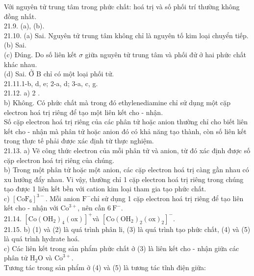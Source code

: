 \documentclass[10pt]{article}
\begin{document}
Với nguyên tử trung tâm trong phức chất: hoá trị và số phối trí thường không đồng nhất.\\
21.9. (a), (b).\\
21.10. (a) Sai. Nguyên tử trung tâm không chỉ là nguyên tố kim loại chuyển tiếp.\\
(b) Sai.\\
(c) Đúng. Do số liên kết $\sigma$ giữa nguyên tử trung tâm và phối đử ở hai phức chất khác nhau.\\
(d) Sai. Ở B chỉ có một loại phối tử.\\
21.11.1-b, d, e; 2-a, d; 3-a, c, g.\\
21.12. a) 2 .\\
b) Không. Có phức chất mà trong đó ethylenediamine chỉ sử dụng một cặp electron hoá trị riêng để tạo một liên kết cho - nhận.\\
Số cặp electron hoá trị riêng của các phân tử hoặc anion thường chỉ cho biết liên kết cho - nhận mà phân tử hoặc anion đó có khả năng tạo thành, còn số liên kết trong thực tế phải được xác định từ thực nghiệm.\\
21.13. a) Vẽ công thức electron của mỗi phân tử và anion, từ đó xác định được số cặp electron hoá trị riêng của chúng.\\
b) Trong một phân tử hoặc một anion, các cặp electron hoá trị càng gần nhau có xu hướng đẩy nhau. Vi vậy, thường chỉ 1 cặp electron hoá trị riêng trong chúng tạo được 1 liên kết bền với cation kim loại tham gia tạo phức chất.\\
c) $\left[\mathrm{CoF}_{6}\right]^{3-}$. Mỗi anion $\mathrm{F}^{-}$chỉ sử dụng 1 cặp electron hoá trị riêng để tạo liên kết cho - nhận với $\mathrm{Co}^{3+}$, nên cần $6 \mathrm{~F}^{-}$.\\
21.14. $\left[\mathrm{Co}\left(\mathrm{OH}_{2}\right)_{4}(\mathrm{ox})\right]^{+}$và $\left[\mathrm{Co}\left(\mathrm{OH}_{2}\right)_{2}(\mathrm{ox})_{2}\right]^{-}$.\\
21.15. b) (1) và (2) là quá trình phân li, (3) là quá trình tạo phức chất, (4) và (5) là quá trình hydrate hoá.\\
c) Các liên kết trong sản phẩm phức chất ở (3) là liên kết cho - nhận giữa các phân tử $\mathrm{H}_{2} \mathrm{O}$ và $\mathrm{Co}^{3+}$.\\
Tương tác trong sản phẩm ở (4) và (5) là tương tác tĩnh điện giữa:
\end{document}
